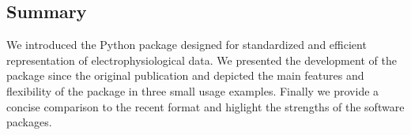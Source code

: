 \subsection{Summary}
We introduced the  Python package designed for standardized and efficient representation of electrophysiological data. We presented the development of the package since the original publication and depicted the main features and flexibility of the package in three small usage examples. Finally we provide a concise comparison to the recent  format and higlight the strengths of the software packages. 

